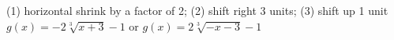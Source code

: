 {(1) horizontal shrink by a factor of 2; (2) shift right 3 units; (3) shift up 1 unit}
{$g(x) = -2\sqrt[3]{x + 3} - 1$ or $g(x) = 2\sqrt[3]{-x - 3} - 1$}